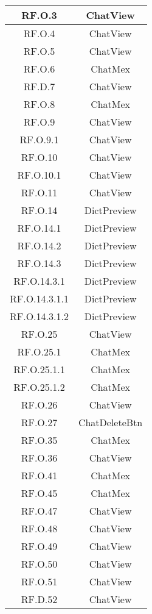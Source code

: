 \begin{adjustwidth}{-0.5cm}{-0.5cm}
\begin{longtable}{|c|c|}
    RF.O.3 & ChatView \\
		\hline RF.O.4 & ChatView \\
    \hline RF.O.5 & ChatView \\
    \hline RF.O.6 & ChatMex \\
    \hline RF.D.7 & ChatView \\
    \hline RF.O.8 & ChatMex \\
    \hline RF.O.9 & ChatView \\
    \hline RF.O.9.1 & ChatView \\
    \hline RF.O.10 & ChatView \\
    \hline RF.O.10.1 & ChatView \\
    \hline RF.O.11 & ChatView \\
    \hline RF.O.14 & DictPreview \\
    \hline RF.O.14.1 & DictPreview \\
    \hline RF.O.14.2 & DictPreview \\
    \hline RF.O.14.3 & DictPreview \\
    \hline RF.O.14.3.1 & DictPreview \\
    \hline RF.O.14.3.1.1 & DictPreview \\
    \hline RF.O.14.3.1.2 & DictPreview \\
    \hline RF.O.25 & ChatView \\
    \hline RF.O.25.1 & ChatMex \\
    \hline RF.O.25.1.1 & ChatMex \\
    \hline RF.O.25.1.2 & ChatMex \\
    \hline RF.O.26 & ChatView \\
    \hline RF.O.27 & ChatDeleteBtn \\
    \hline RF.O.35 & ChatMex \\
    \hline RF.O.36 & ChatView \\
    \hline RF.O.41 & ChatMex \\
    \hline RF.O.45 & ChatMex \\
    \hline RF.O.47 & ChatView \\
    \hline RF.O.48 & ChatView \\
    \hline RF.O.49 & ChatView \\
    \hline RF.O.50 & ChatView \\
    \hline RF.O.51 & ChatView \\
    \hline RF.D.52 & ChatView \\
  \end{longtable}
\end{adjustwidth}
\egroup

